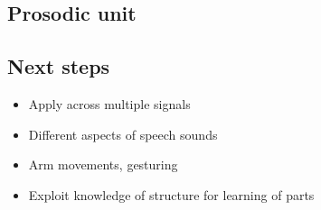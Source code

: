 






\subsection{Prosodic unit}


\subsection{Next steps}


\begin{itemize}

\item Apply across multiple signals

\item Different aspects of speech sounds

\item Arm movements, gesturing

\item Exploit knowledge of structure for learning of parts

\end{itemize}


